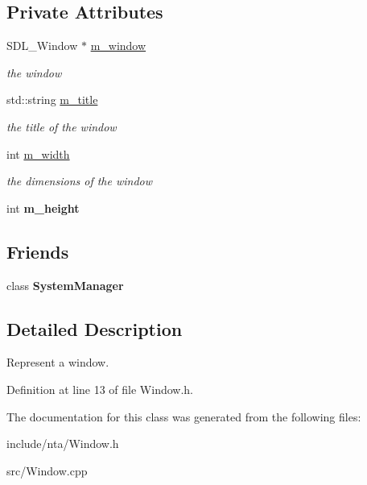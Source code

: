 \subsection*{Private Attributes}
\begin{DoxyCompactItemize}
\item 
\mbox{\label{classnta_1_1Window_a1e216236a7fdee82775fadef72a972ae}} 
S\+D\+L\+\_\+\+Window $\ast$ \hyperlink{classnta_1_1Window_a1e216236a7fdee82775fadef72a972ae}{m\+\_\+window}
\begin{DoxyCompactList}\small\item\em the window \end{DoxyCompactList}\item 
\mbox{\label{classnta_1_1Window_a9034f9c0d5054ffd61782e2722432c63}} 
std\+::string \hyperlink{classnta_1_1Window_a9034f9c0d5054ffd61782e2722432c63}{m\+\_\+title}
\begin{DoxyCompactList}\small\item\em the title of the window \end{DoxyCompactList}\item 
\mbox{\label{classnta_1_1Window_aafa280d9434d31442028729eb0b01689}} 
int \hyperlink{classnta_1_1Window_aafa280d9434d31442028729eb0b01689}{m\+\_\+width}
\begin{DoxyCompactList}\small\item\em the dimensions of the window \end{DoxyCompactList}\item 
\mbox{\label{classnta_1_1Window_a3857aecdc891f739b24030f7e8423529}} 
int {\bfseries m\+\_\+height}
\end{DoxyCompactItemize}
\subsection*{Friends}
\begin{DoxyCompactItemize}
\item 
\mbox{\label{classnta_1_1Window_ab1ef2aa9992dd8ae85793e1a1f980e1e}} 
class {\bfseries System\+Manager}
\end{DoxyCompactItemize}


\subsection{Detailed Description}
Represent a window. 

Definition at line 13 of file Window.\+h.



The documentation for this class was generated from the following files\+:\begin{DoxyCompactItemize}
\item 
include/nta/Window.\+h\item 
src/Window.\+cpp\end{DoxyCompactItemize}
